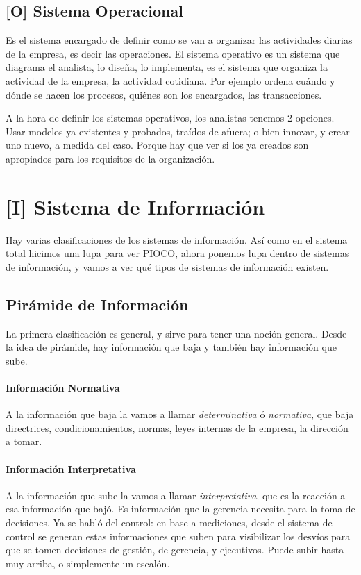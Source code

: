\hypertarget{sistema-operativo}{%
\subsection{{[}O{]} Sistema Operacional}\label{sistema-operativo}}

Es el sistema encargado de definir como se van a organizar las
actividades diarias de la empresa, es decir las operaciones. El sistema
operativo es un sistema que diagrama el analista, lo diseña, lo
implementa, es el sistema que organiza la actividad de la empresa, la
actividad cotidiana. Por ejemplo ordena cuándo y dónde se hacen los
procesos, quiénes son los encargados, las transacciones.

A la hora de definir los sistemas operativos, los analistas tenemos 2
opciones. Usar modelos ya existentes y probados, traídos de afuera; o
bien innovar, y crear uno nuevo, a medida del caso. Porque hay que ver
si los ya creados son apropiados para los requisitos de la organización.

\hypertarget{sistema-de-informaciuxf3n}{%
\section{{[}I{]} Sistema de Información}\label{sistema-de-informaciuxf3n}}

Hay varias clasificaciones de los sistemas de información. Así como en
el sistema total hicimos una lupa para ver PIOCO, ahora ponemos lupa
dentro de sistemas de información, y vamos a ver qué tipos de sistemas
de información existen.

\hypertarget{piruxe1mide-de-informaciuxf3n}{%
\subsection{Pirámide de
Información}\label{piruxe1mide-de-informaciuxf3n}}

La primera clasificación es general, y sirve para tener una noción
general. Desde la idea de pirámide, hay información que baja y también
hay información que sube. 
\paragraph{Información Normativa}
A la información que baja la vamos a llamar
\emph{determinativa} ó \emph{normativa}, que baja directrices,
condicionamientos, normas, leyes internas de la empresa, la dirección a
tomar. 
\paragraph{Información Interpretativa}
A la información que sube la vamos a llamar
\emph{interpretativa}, que es la reacción a esa información que bajó. Es
información que la gerencia necesita para la toma de decisiones. Ya se
habló del control: en base a mediciones, desde el sistema de control se
generan estas informaciones que suben para visibilizar los desvíos para
que se tomen decisiones de gestión, de gerencia, y ejecutivos. Puede
subir hasta muy arriba, o simplemente un escalón. 

